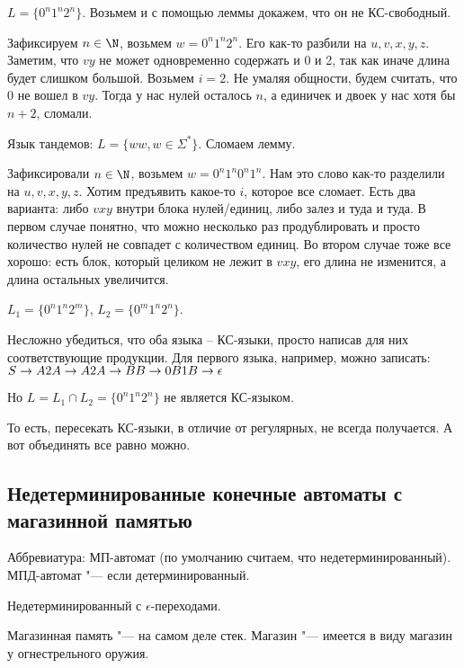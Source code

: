 \begin{exmp}
$L = \{0^n1^n2^n\}$. Возьмем и с помощью леммы докажем, что он не КС-свободный.

Зафиксируем $n \in \N$, возьмем $w = 0^n1^n2^n$. Его как-то разбили на $u, v, x, y, z$. 
Заметим, что $vy$ не может одновременно содержать и 0 и 2, так как иначе длина будет слишком большой.
Возьмем $i = 2$. Не умаляя общности, будем считать, что 0 не вошел в $vy$. Тогда у нас нулей осталось $n$, а единичек и двоек у нас хотя бы $n + 2$, сломали.
\end{exmp}

\begin{exmp}
Язык тандемов: $L = \{ww, w \in \Sigma^*\}$. Сломаем лемму.

Зафиксировали $n \in \N$, возьмем $w = 0^n1^n0^n1^n$. Нам это слово как-то разделили на $u, v, x, y, z$. 
Хотим предъявить какое-то $i$, которое все сломает. Есть два варианта: либо $vxy$ внутри блока нулей/единиц, либо залез и туда и туда.
В первом случае понятно, что можно несколько раз продублировать и просто количество нулей не совпадет с количеством единиц.
Во втором случае тоже все хорошо: есть блок, который целиком не лежит в $vxy$, его длина не изменится, а длина остальных увеличится.
\end{exmp}
\begin{conseq}
$L_1 = \{0^n1^n2^m\}$, $L_2 = \{0^m1^n2^n\}$.

Несложно убедиться, что оба языка -- КС-языки, просто написав для них соответствующие продукции.
Для первого языка, например, можно записать: $\\
S \to A2\\
A \to A2\\
A \to B\\
B \to 0B1\\
B \to \epsilon$

Но $L = L_1 \cap L_2 = \{0^n1^n2^n\}$ не является КС-языком.

То есть, пересекать КС-языки, в отличие от регулярных, не всегда получается. А вот объединять все равно можно.
\end{conseq}

\subsection{Недетерминированные конечные автоматы с магазинной памятью}
\begin{Rem}
Аббревиатура: МП-автомат (по умолчанию считаем, что недетерминированный). МПД-автомат "--- если детерминированный.
\end{Rem}
\begin{Rem}
Недетерминированный с $\epsilon$-переходами.
\end{Rem}
Магазинная память "--- на самом деле стек. Магазин "--- имеется в виду магазин у огнестрельного оружия.

